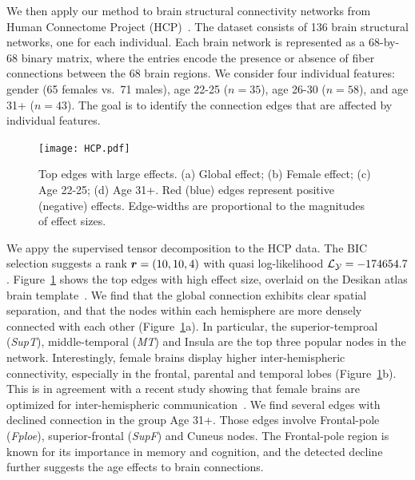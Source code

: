 \documentclass{article}
\theoremstyle{definition}
\theoremstyle{definition}
\begin{document}
We then apply our method to brain structural connectivity networks from Human Connectome Project (HCP)~\citep{HCP}. %
The dataset consists of 136 brain structural networks, one for each individual. Each brain network is represented as a 68-by-68 binary matrix, where the entries encode the presence or absence of fiber connections between the 68 brain regions. We consider four individual features: gender (65 females vs.\ 71 males), age 22-25 ($n=35$), age 26-30 ($n=58$), and age 31+ ($n=43$). The goal is to identify the connection edges that are affected by individual features. 

\begin{figure}[!h]
\centering
\texttt{[image: HCP.pdf]}
\vspace{-.5cm}
\caption{\small Top edges with large effects. (a) Global effect; (b) Female effect; (c) Age 22-25; (d) Age 31+. Red (blue) edges represent positive (negative) effects. Edge-widths are proportional to the magnitudes of effect sizes.
}\label{fig:brain}
\vspace{-.2cm}
\end{figure}


We appy the supervised tensor decomposition to the HCP data. The BIC selection suggests a rank $\bm{r}=(10,10,4)$ with quasi log-likelihood $\mathcal{L}_{\mathcal{Y}}=-174654.7$. Figure~\ref{fig:brain} shows the top edges with high effect size, overlaid on the Desikan atlas brain template~\citep{desikan2006automated}. We find that the global connection exhibits clear spatial separation, and that the nodes within each hemisphere are more densely connected with each other (Figure~\ref{fig:brain}a). In particular, the superior-temproal (\emph{SupT}), middle-temporal (\emph{MT}) and Insula are the top three popular nodes in the network. Interestingly, female brains display higher inter-hemispheric connectivity, especially in the frontal, parental and temporal lobes (Figure~\ref{fig:brain}b). This is in agreement with a recent study showing that female brains are optimized for inter-hemispheric communication~\citep{ingalhalikar2014sex}. We find several edges with declined connection in the group Age 31+. Those edges involve Frontal-pole (\emph{Fploe}), superior-frontal (\emph{SupF}) and Cuneus nodes. The Frontal-pole region is known for its importance in memory and cognition, and the detected decline further suggests the age effects to brain connections.
\end{document}
